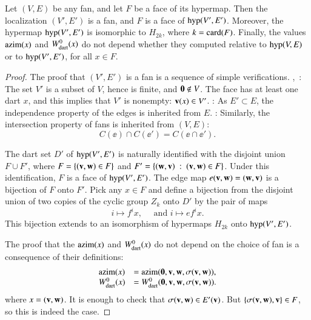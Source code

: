 \begin{lemma}[localization]\label{lemma:localization}  
Let $(V,E)$ be any fan, and let $F$ be a face of its hypermap.  
Then the localization $(V',E')$ is a fan, and $F$ is a face of ${\operatorname{hyp}}(V',E')$.  Moreover, the hypermap ${\operatorname{hyp}}(V',E')$ is isomorphic
to $H_{2k}$, where $k= {\operatorname{card}}(F)$.
 Finally, the values ${\operatorname{azim}}(x)$ and $W^0_{\text{dart}}(x)$  do not depend
whether they computed relative to ${\operatorname{hyp}}(V,E)$ or to ${\operatorname{hyp}}(V',E')$, for all $x\in F$.
\end{lemma}



\begin{proof}
The proof that  $(V',E')$ is a fan is a sequence of simple verifications.
,~: The set $V'$ is a subset of $V$, hence is finite, and ${\mathbf 0}\not\in V$.  The face has at least one dart $x$, and this implies that $V'$ is nonempty: ${\mathbf v}(x)\in V'$.  : As $E'\subset E$, the independence property of the edges is inherited from $E$.  : Similarly, the intersection property of fans is inherited from $(V,E)$:
$$
C(\ee)\cap C(\ee') = C(\ee\cap \ee').
$$

The dart set $D'$ of ${\operatorname{hyp}}(V',E')$ is naturally identified with the disjoint union $F\cup F'$, where
$F = \{({\mathbf v},{\mathbf w}) \in F\}$ and $F'=\{({\mathbf w},{\mathbf v}) \ :\  ({\mathbf v},{\mathbf w})\in F\}$.  Under this identification, $F$ is a face of ${\operatorname{hyp}}(V',E')$.  The edge map $e({\mathbf v},{\mathbf w})= ({\mathbf w},{\mathbf v})$ is a bijection of $F$ onto $F'$.   Pick any $x\in F$ and
define a bijection from the disjoint union of two copies of the cyclic group $Z_k$ onto $D'$  by 
the pair of maps
$$
i \mapsto f^i x,\quad\text{ and } i\mapsto e f^i x.
$$
This bijection extends to an isomorphism of hypermaps $H_{2k}$ onto ${\operatorname{hyp}}(V',E')$.

The proof that the ${\operatorname{azim}}(x)$ and $W^0_{\text{dart}}(x)$ do not depend on the choice of fan is a consequence of their definitions:
$$
\begin{array}{lll}
{\operatorname{azim}}(x) &= {\operatorname{azim}}({\mathbf 0},{\mathbf v},{\mathbf w},\sigma({\mathbf v},{\mathbf w})),\\
W^0_{\text{dart}}(x) &= W^0_{\text{dart}}({\mathbf 0},{\mathbf v},{\mathbf w},\sigma({\mathbf v},{\mathbf w})).\\
\end{array}
$$
where $x = ({\mathbf v},{\mathbf w})$.    It is enough to check that $\sigma({\mathbf v},{\mathbf w})\in E'({\mathbf v})$. 
But $\{\sigma({\mathbf v},{\mathbf w}),{\mathbf v}\}\in F$, so this is indeed the case.
\end{proof}


